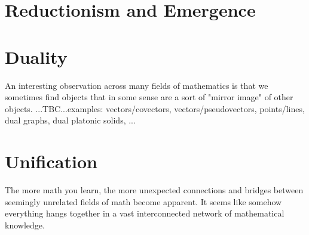 \section{Reductionism and Emergence}


\section{Duality}
An interesting observation across many fields of mathematics is that we sometimes find objects that in some sense are a sort of "mirror image" of other objects. ...TBC...examples: vectors/covectors, vectors/pseudovectors, points/lines, dual graphs, dual platonic solids, ...





\section{Unification}
The more math you learn, the more unexpected connections and bridges between seemingly unrelated fields of math become apparent. It seems like somehow everything hangs together in a vast interconnected network of mathematical knowledge. 




\begin{comment}

-Formalism vs Intution
-Precision, Non-Ambiguity of langauge
-Automation/mechanization of thought
-Finitism, Constructivism

\end{comment}